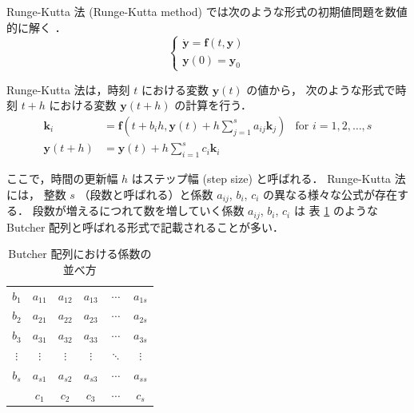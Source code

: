%

Runge-Kutta 法 (Runge-Kutta method) では次のような形式の初期値問題を数値的に解く
\cite{Mitsui1993}．
\begin{equation}
    \begin{cases}
        \dot{\bm{y}} = \bm{f}(t, \bm{y}) \\
        \bm{y}(0) = \bm{y}_0
    \end{cases}
\end{equation}

Runge-Kutta 法は，時刻 $t$ における変数 $\bm{y}(t)$ の値から，
次のような形式で時刻 $t + h$ における変数 $\bm{y}(t + h)$ の計算を行う．
\begin{align}
    \bm{k}_i      & = \bm{f}\left(t + b_i h, \bm{y}(t) + h \sum_{j = 1}^s a_{ij} \bm{k}_j \right)
                  & \text{for $i = 1, 2, \ldots, s$}
    \label{eq:ode_runge-kutta_k-law}                                                              \\
    \bm{y}(t + h) & = \bm{y}(t) + h \sum_{i=1}^s c_i \bm{k}_i
    \label{eq:ode_runge-kutta_y-law}
\end{align}

ここで，時間の更新幅 $h$ はステップ幅 (step size) と呼ばれる．
Runge-Kutta 法には，
整数 $s$ （段数と呼ばれる）と係数 $a_{ij}$, $b_i$, $c_i$ の異なる様々な公式が存在する．
段数が増えるにつれて数を増していく係数 $a_{ij}$, $b_i$, $c_i$ は
表 \ref{table:ode_runge-kutta_butcher-array-general} のような
Butcher 配列と呼ばれる形式で記載されることが多い．

\begin{table}[bp]
    \caption{Butcher 配列における係数の並べ方}
    \label{table:ode_runge-kutta_butcher-array-general}
    \centering
    \begin{tabular}{c|ccccc}
        $b_1$    & $a_{11}$ & $a_{12}$ & $a_{13}$ & $\cdots$ & $a_{1s}$ \\
        $b_2$    & $a_{21}$ & $a_{22}$ & $a_{23}$ & $\cdots$ & $a_{2s}$ \\
        $b_3$    & $a_{31}$ & $a_{32}$ & $a_{33}$ & $\cdots$ & $a_{3s}$ \\
        $\vdots$ & $\vdots$ & $\vdots$ & $\vdots$ & $\ddots$ & $\vdots$ \\
        $b_s$    & $a_{s1}$ & $a_{s2}$ & $a_{s3}$ & $\cdots$ & $a_{ss}$ \\
        \hline
                 & $c_1$    & $c_2$    & $c_3$    & $\cdots$ & $c_s$
    \end{tabular}
\end{table}

